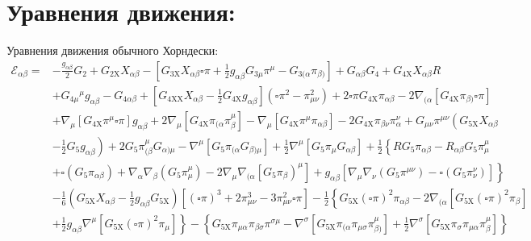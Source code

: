 \documentclass[12pt,a4paper,svgnames]{extarticle}
\begin{document}
\section{Уравнения движения:}
Уравнения движения обычного Хорндески:
\begin{align*}
\mathcal{E}_{\alpha \beta}=&-\frac{g_{\alpha \beta}}{2} G_{2}+G_{2 \mathrm{X}} X_{\alpha \beta}-\left[G_{3 \mathrm{X}} X_{\alpha \beta} \square \pi+\frac{1}{2} g_{\alpha \beta} G_{3 \mu} \pi^{\mu}-G_{3(\alpha} \pi_{\beta)}\right]+G_{\alpha \beta} G_{4}+G_{4 \mathrm{X}} X_{\alpha \beta} R \\
&+G_{4 \mu}{ }^{\mu} g_{\alpha \beta}-G_{4 \alpha \beta}+\left[G_{4 \mathrm{XX}} X_{\alpha \beta}-\frac{1}{2} G_{4 \mathrm{X}} g_{\alpha \beta}\right]\left(\square \pi^{2}-\pi_{\mu \nu}^{2}\right)+2 \square \pi G_{4 \mathrm{X}} \pi_{\alpha \beta}-2 \nabla_{(\alpha}\left[G_{4 \mathrm{X}} \pi_{\beta)} \square \pi\right] \\
&+\nabla_{\mu}\left[G_{4 \mathrm{X}} \pi^{\mu} \square \pi\right] g_{\alpha \beta}+2 \nabla_{\mu}\left[G_{4 \mathrm{X}} \pi_{(\alpha} \pi_{\beta}^{\mu}\right]-\nabla_{\mu}\left[G_{4 \mathrm{X}} \pi^{\mu} \pi_{\alpha \beta}\right]-2 G_{4 \mathrm{X}} \pi_{\beta \nu} \pi_{\alpha}^{\nu}+G_{\mu \nu} \pi^{\mu \nu}\left(G_{5 \mathrm{X}} X_{\alpha \beta}\right.\\
&\left.-\frac{1}{2} G_{5} g_{\alpha \beta}\right)+2 G_{5} \pi_{(\beta}^{\mu} G_{\alpha) \mu}-\nabla^{\mu}\left[G_{5} \pi_{(\alpha} G_{\beta) \mu}\right]+\frac{1}{2} \nabla^{\mu}\left[G_{5} \pi_{\mu} G_{\alpha \beta}\right]+\frac{1}{2}\left\{R G_{5} \pi_{\alpha \beta}-R_{\alpha \beta} G_{5} \pi_{\mu}^{\mu}\right.\\
&\left.\left.+\square\left(G_{5} \pi_{\alpha \beta}\right)+\nabla_{\alpha} \nabla_{\beta}\left(G_{5} \pi_{\mu}^{\mu}\right)-2 \nabla_{\mu} \nabla_{(\alpha}\left[G_{5} \pi_{\beta}\right)^{\mu}\right]+g_{\alpha \beta}\left[\nabla_{\mu} \nabla_{\nu}\left(G_{5} \pi^{\mu \nu}\right)-\square\left(G_{5} \pi_{\nu}^{\nu}\right)\right]\right\} \\
&-\frac{1}{6}\left(G_{5 \mathrm{X}} X_{\alpha \beta}-\frac{1}{2} g_{\alpha \beta} G_{5 \mathrm{X}}\right)\left[(\square \pi)^{3}+2 \pi_{\mu \nu}^{3}-3 \pi_{\mu \nu}^{2} \square \pi\right]-\frac{1}{2}\left\{G_{5 \mathrm{X}}(\square \pi)^{2} \pi_{\alpha \beta}-2 \nabla_{(\alpha}\left[G_{5 \mathrm{X}}(\square \pi)^{2} \pi_{\beta}\right]\right.\\
&\left.+\frac{1}{2} g_{\alpha \beta} \nabla^{\mu}\left[G_{5 \mathrm{X}}(\square \pi)^{2} \pi_{\mu}\right]\right\}-\left\{G_{5 \mathrm{X}} \pi_{\mu \alpha} \pi_{\beta \sigma} \pi^{\sigma \mu}-\nabla^{\sigma}\left[G_{5 \mathrm{X}} \pi_{(\alpha} \pi_{\mu \sigma} \pi_{\beta)}^{\mu}\right]+\frac{1}{2} \nabla^{\sigma}\left[G_{5 \mathrm{X}} \pi_{\sigma} \pi_{\mu \alpha} \pi_{\beta}^{\mu}\right]\right\} \\

\end{align*}
\end{document}
